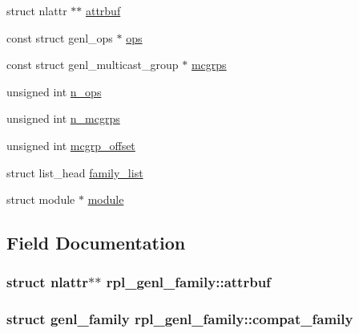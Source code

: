 \begin{DoxyCompactItemize}
\item 
struct nlattr $\ast$$\ast$ \hyperlink{structrpl__genl__family_a3ad09df2fe4ef38e5efc0c3ef7cc5fb6}{attrbuf}
\item 
const struct genl\+\_\+ops $\ast$ \hyperlink{structrpl__genl__family_a2d6fa633ee14f455af7965bf76508255}{ops}
\item 
const struct genl\+\_\+multicast\+\_\+group $\ast$ \hyperlink{structrpl__genl__family_aa824bef8504ad3a92bc3fdd62d7554ec}{mcgrps}
\item 
unsigned int \hyperlink{structrpl__genl__family_a2015e11f05185d06f8ef4125a43fd48b}{n\+\_\+ops}
\item 
unsigned int \hyperlink{structrpl__genl__family_aa39896dd5abd2de8beaeaa1a39d61c98}{n\+\_\+mcgrps}
\item 
unsigned int \hyperlink{structrpl__genl__family_a9b80c856eaea457b92e8e3997a09df9e}{mcgrp\+\_\+offset}
\item 
struct list\+\_\+head \hyperlink{structrpl__genl__family_a3b34f3eda668c9cd2340349615467eb9}{family\+\_\+list}
\item 
struct module $\ast$ \hyperlink{structrpl__genl__family_a8c514aedced0b4c6421aa08881aa1609}{module}
\end{DoxyCompactItemize}


\subsection{Field Documentation}
\hypertarget{structrpl__genl__family_a3ad09df2fe4ef38e5efc0c3ef7cc5fb6}{}
\subsubsection[{attrbuf}]{\setlength{\rightskip}{0pt plus 5cm}struct nlattr$\ast$$\ast$ rpl\+\_\+genl\+\_\+family\+::attrbuf}\label{structrpl__genl__family_a3ad09df2fe4ef38e5efc0c3ef7cc5fb6}
\hypertarget{structrpl__genl__family_a6da3fbe86360d91cce207287b2de165d}{}
\subsubsection[{compat\+\_\+family}]{\setlength{\rightskip}{0pt plus 5cm}struct {\bf genl\+\_\+family} rpl\+\_\+genl\+\_\+family\+::compat\+\_\+family}\label{structrpl__genl__family_a6da3fbe86360d91cce207287b2de165d}
\hypertarget{structrpl__genl__family_a3b34f3eda668c9cd2340349615467eb9}{}
